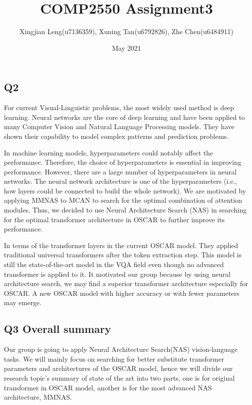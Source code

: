 \documentclass[12pt, a4paper]{article}
\title{COMP2550 Assignment3}
\author{Xingjian Leng(u7136359), Xuning Tan(u6792826), Zhe Chen(u6484911)}
\date{May 2021}
\begin{document}
    
\maketitle

\subsection*{Q2}

\par\noindent For current Visual-Linguistic problems, the most widely used method is deep learning. Neural networks are the core of deep learning and have been applied to many Computer Vision and Natural Language Processing models. They have shown their capability to model complex patterns and prediction problems.

\par\noindent \newline In machine learning models, hyperparameters could notably affect the performance. Therefore, the choice of hyperparameters is essential in improving performance. However, there are a large number of hyperparameters in neural networks. The neural network architecture is one of the hyperparameters (i.e., how layers could be connected to build the whole network). We are motivated by applying MMNAS \cite{DBLP:journals/corr/abs-2004-12070} to MCAN \cite{DBLP:journals/corr/abs-1906-10770} to search for the optimal combination of attention modules. Thus, we decided to use Neural Architecture Search (NAS) in searching for the optimal transformer architecture in OSCAR \cite{DBLP:journals/corr/abs-2004-06165} to further improve its performance.

\par\noindent \newline In terms of the transformer layers in the current OSCAR \cite{DBLP:journals/corr/abs-2004-06165} model. They applied traditional universal transformers \cite{DBLP:journals/corr/VaswaniSPUJGKP17} after the token extraction step. This model is still the state-of-the-art model in the VQA field even though no advanced transformer is applied to it. It motivated our group because by using neural architecture search, we may find a superior transformer architecture especially for OSCAR. A new OSCAR model with higher accuracy or with fewer parameters may emerge.


\subsection*{Q3 Overall summary}
\par\noindent Our group is going to apply Neural Architecture Search(NAS) vision-language tasks. We will mainly focus on searching for better substitute transformer parameters and architectures of the OSCAR \cite{DBLP:journals/corr/abs-2004-06165} model, hence we will divide our research topic's summary of state of the art into 
two parts, one is for original transformer in OSCAR \cite{DBLP:journals/corr/abs-2004-06165} model, another is for the most advanced NAS 
architecture, MMNAS.
\end{document}
